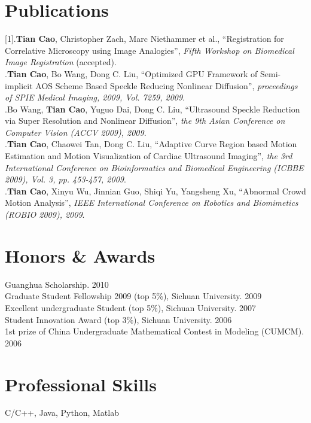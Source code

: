 \documentclass[line,margin]{res}
\begin{document}
\begin{resume}
\section{\sc Publications}  

[1].\textbf{Tian Cao}, Christopher Zach, Marc Niethammer et al., ``Registration for Correlative Microscopy using Image Analogies'',  \emph{Fifth Workshop on Biomedical Image Registration} (accepted).\vspace{.1in}\\
\smallskip
[2].\textbf{Tian Cao}, Bo Wang, Dong C. Liu, ``Optimized GPU Framework of Semi-implicit AOS
Scheme Based Speckle Reducing Nonlinear Diﬀusion'',  \emph{proceedings of SPIE Medical Imaging, 2009, Vol. 7259, 2009}.\vspace{.1in}\\
\smallskip
[3].Bo Wang, \textbf{Tian Cao}, Yuguo Dai, Dong C. Liu, ``Ultrasound Speckle Reduction via Super Resolution and Nonlinear Diffusion'',  \emph{the 9th Asian Conference on Computer Vision (ACCV 2009), 2009}. \vspace{.1in}\\
\smallskip
[4].\textbf{Tian Cao}, Chaowei Tan, Dong C. Liu, ``Adaptive Curve Region based Motion Estimation and Motion Visualization of Cardiac Ultrasound Imaging'',  \emph{the 3rd International Conference on Bioinformatics and Biomedical Engineering (ICBBE 2009), Vol. 3, pp. 453-457, 2009}.\vspace{.1in}\\
\smallskip
[5].\textbf{Tian Cao}, Xinyu Wu, Jinnian Guo, Shiqi Yu, Yangsheng Xu, ``Abnormal Crowd Motion Analysis'', \emph{IEEE International Conference on Robotics and Biomimetics (ROBIO 2009), 2009}.

 
\section{\sc Honors \& Awards}
\smallskip


Guanghua Scholarship.  \hfill       2010\vspace{.1in}\\
Graduate Student Fellowship 2009 (top 5\%), Sichuan University.  \hfill       2009\vspace{.1in}\\
Excellent undergraduate Student (top 5\%), Sichuan University.  \hfill       2007\vspace{.1in}\\
Student Innovation Award (top 3\%), Sichuan University.  \hfill       2006\vspace{.1in}\\
1st prize of China Undergraduate Mathematical Contest in Modeling (CUMCM).  \hfill       2006

\section{\sc Professional Skills}
\smallskip

C/C++, Java, Python, Matlab %

\end{resume}

%
%
\end{document}
